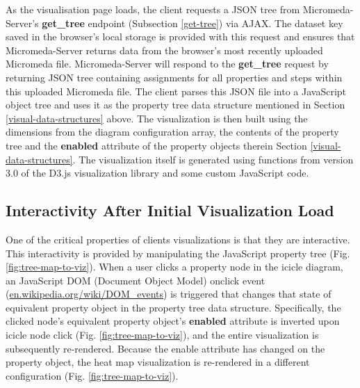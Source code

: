 As the visualisation page loads, the client requests a JSON tree from Micromeda-Server's \textbf{get\_tree} endpoint (Subsection \ref{get-tree}) via AJAX. The dataset key saved in the browser's local storage is provided with this request and ensures that Micromeda-Server returns data from the browser's most recently uploaded Micromeda file. Micromeda-Server will respond to the \textbf{get\_tree} request by returning JSON tree containing assignments for all properties and steps within this uploaded Micromeda file. The client parses this JSON file into a JavaScript object tree and uses it as the property tree data structure mentioned in Section \ref{visual-data-structures} above. The visualization is then built using the dimensions from the diagram configuration array, the contents of the property tree and the \textbf{enabled} attribute of the property objects therein Section \ref{visual-data-structures}. The visualization itself is generated using functions from version 3.0 of the D3.js visualization library \cite{bostock2015d3} and some custom JavaScript code.

\subsection{Interactivity After Initial Visualization Load}

One of the critical properties of clients visualizations is that they are interactive. This interactivity is provided by manipulating the JavaScript property tree (Fig. \ref{fig:tree-map-to-viz}). When a user clicks a property node in the icicle diagram, an JavaScript DOM (Document Object Model) onclick event \cite{dom-events} (\href{en.wikipedia.org/wiki/DOM\_events}{en.wikipedia.org/wiki/DOM\_events}) is triggered that changes that state of equivalent property object in the property tree data structure. Specifically, the clicked node's equivalent property object's \textbf{enabled} attribute is inverted upon icicle node click (Fig. \ref{fig:tree-map-to-viz}), and the entire visualization is subsequently re-rendered. Because the enable attribute has changed on the property object, the heat map visualization is re-rendered in a different configuration (Fig. \ref{fig:tree-map-to-viz}). 

